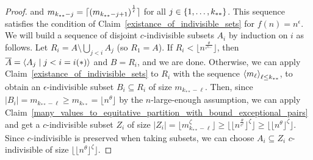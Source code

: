 \begin{theorem}[Theorem 4.23]
\begin{proof}
            and $m_{k_{**}-j} = \lceil \left( m_{k_{**}-j+1} \right)^{\frac{1}{\epsilon}} \rceil$ for all $j \in \left\{ 1, \dots, k_{**} \right\}$.
            This sequence satisfies the condition of Claim~\ref{existance_of_indivisible_sets} for $f(n) = n^\epsilon$.
            We will build a sequence of disjoint $c$-indivisible subsets $A_i$ by induction on $i$ as follows.
            Let $R_i = A \setminus \bigcup_{j<i} A_j$ (so $R_1 = A$).
            If $R_i < \lfloor n^{\frac{\theta}{\epsilon^{k_{**}}}} \rfloor$, then
            $\overline{A} = \left< A_j \mid j < i = i(*) \right>$ and $B = R_i$, and we are done.
            Otherwise, we can apply Claim~\ref{existance_of_indivisible_sets} to $R_i$ with the sequence
            $\left< m_\ell \right>_{\ell \leq k_{**}}$, to obtain an $\epsilon$-indivisible subset $B_i \subseteq R_i$ of
            size $m_{k_{**}-\ell}$.
            Then, since $|B_i| = m_{k_{**}-\ell} \geq m_{k_{**}} = \lfloor n^\theta \rfloor$ by the $n$-large-enough assumption,
            we can apply Claim~\ref{many_values_to_equitative_partition_with_bound_exceptional_pairs} and get a
            $c$-indivisible subset $Z_i$ of size $|Z_i| = \lfloor m_{k_{**}-\ell}^\zeta \rfloor
            \geq \lfloor \lfloor n^{\frac{\theta}{\epsilon^\ell}} \rfloor ^\zeta \rfloor
            \geq \lfloor \lfloor n^{\theta} \rfloor ^\zeta \rfloor$.
            Since $c$-indivisible is preserved when taking subsets, 
            we can choose $A_i \subseteq Z_i$ $c$-indivisible of size $\lfloor \lfloor n^{\theta} \rfloor ^\zeta \rfloor$.
        \end{proof}
    \end{theorem}


